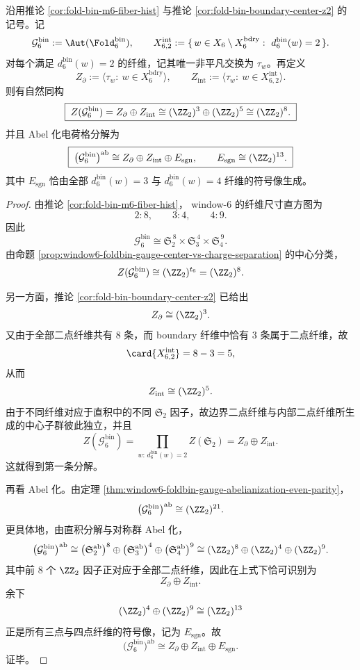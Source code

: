 \begin{theorem}\label{thm:window6-foldbin-gauge-center-boundary-direct-sum}
沿用推论 \ref{cor:fold-bin-m6-fiber-hist} 与推论 \ref{cor:fold-bin-boundary-center-z2} 的记号。记
\[
\mathcal G_6^{\mathrm{bin}}:=\Aut(\Fold_6^{\mathrm{bin}}),
\qquad
X_{6,2}^{\mathrm{int}}
:=
\{\,w\in X_6\setminus X_6^{\mathrm{bdry}}:\ d^{\mathrm{bin}}_6(w)=2\,\}.
\]
对每个满足 \(d^{\mathrm{bin}}_6(w)=2\) 的纤维，记其唯一非平凡交换为 \(\tau_w\)。再定义
\[
Z_{\partial}:=\langle \tau_w:\ w\in X_6^{\mathrm{bdry}}\rangle,
\qquad
Z_{\mathrm{int}}:=\langle \tau_w:\ w\in X_{6,2}^{\mathrm{int}}\rangle.
\]
则有自然同构
\[
\boxed{\;
Z(\mathcal G_6^{\mathrm{bin}})
=
Z_{\partial}\oplus Z_{\mathrm{int}}
\cong
(\ZZ_2)^3\oplus(\ZZ_2)^5
\cong
(\ZZ_2)^8.\;}
\]
并且 Abel 化电荷格分解为
\[
\boxed{\;
\bigl(\mathcal G_6^{\mathrm{bin}}\bigr)^{\mathrm{ab}}
\cong
Z_{\partial}\oplus Z_{\mathrm{int}}\oplus E_{\mathrm{sgn}},
\qquad
E_{\mathrm{sgn}}\cong (\ZZ_2)^{13}.\;}
\]
其中 \(E_{\mathrm{sgn}}\) 恰由全部 \(d^{\mathrm{bin}}_6(w)=3\) 与 \(d^{\mathrm{bin}}_6(w)=4\) 纤维的符号像生成。
\end{theorem}
\begin{proof}
由推论 \ref{cor:fold-bin-m6-fiber-hist}，
window-\(6\) 的纤维尺寸直方图为
\[
2:8,\qquad 3:4,\qquad 4:9.
\]
因此
\[
\mathcal G_6^{\mathrm{bin}}
\cong
\mathfrak S_2^{\,8}\times \mathfrak S_3^{\,4}\times \mathfrak S_4^{\,9}.
\]
由命题 \ref{prop:window6-foldbin-gauge-center-vs-charge-separation} 的中心分类，
\[
Z(\mathcal G_6^{\mathrm{bin}})\cong (\ZZ_2)^{t_6}=(\ZZ_2)^8.
\]

另一方面，推论 \ref{cor:fold-bin-boundary-center-z2} 已给出
\[
Z_{\partial}\cong (\ZZ_2)^3.
\]
又由于全部二点纤维共有 \(8\) 条，而 boundary 纤维中恰有 \(3\) 条属于二点纤维，故
\[
\card{X_{6,2}^{\mathrm{int}}}=8-3=5,
\]
从而
\[
Z_{\mathrm{int}}\cong (\ZZ_2)^5.
\]
由于不同纤维对应于直积中的不同 \(\mathfrak S_2\) 因子，故边界二点纤维与内部二点纤维所生成的中心子群彼此独立，并且
\[
Z(\mathcal G_6^{\mathrm{bin}})
=
\prod_{w:\,d^{\mathrm{bin}}_6(w)=2} Z(\mathfrak S_2)
=
Z_{\partial}\oplus Z_{\mathrm{int}}.
\]
这就得到第一条分解。

再看 Abel 化。由定理 \ref{thm:window6-foldbin-gauge-abelianization-even-parity}，
\[
\bigl(\mathcal G_6^{\mathrm{bin}}\bigr)^{\mathrm{ab}}
\cong
(\ZZ_2)^{21}.
\]
更具体地，由直积分解与对称群 Abel 化，
\[
\bigl(\mathcal G_6^{\mathrm{bin}}\bigr)^{\mathrm{ab}}
\cong
\bigl(\mathfrak S_2^{\mathrm{ab}}\bigr)^{8}
\oplus
\bigl(\mathfrak S_3^{\mathrm{ab}}\bigr)^{4}
\oplus
\bigl(\mathfrak S_4^{\mathrm{ab}}\bigr)^{9}
\cong
(\ZZ_2)^8\oplus(\ZZ_2)^4\oplus(\ZZ_2)^9.
\]
其中前 \(8\) 个 \(\ZZ_2\) 因子正对应于全部二点纤维，因此在上式下恰可识别为
\[
Z_{\partial}\oplus Z_{\mathrm{int}}.
\]
余下
\[
(\ZZ_2)^4\oplus(\ZZ_2)^9\cong (\ZZ_2)^{13}
\]
正是所有三点与四点纤维的符号像，记为 \(E_{\mathrm{sgn}}\)。故
\[
\bigl(\mathcal G_6^{\mathrm{bin}}\bigr)^{\mathrm{ab}}
\cong
Z_{\partial}\oplus Z_{\mathrm{int}}\oplus E_{\mathrm{sgn}}.
\]
证毕。
\end{proof}

\endinput
